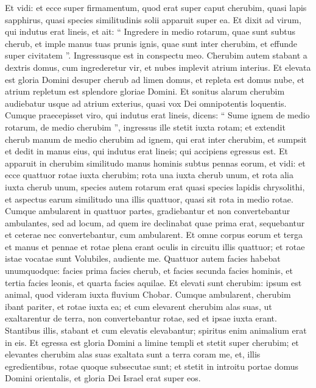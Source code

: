 \begin{biblechapter}
\begin{biblechapter}
\begin{biblechapter}
\begin{biblechapter}
\begin{biblechapter}
\begin{biblechapter}
\begin{biblechapter}
\begin{biblechapter}
\begin{biblechapter}
\begin{biblechapter}
\verse Et vidi: et ecce super firmamentum, quod erat super caput cherubim, quasi lapis sapphirus, quasi species similitudinis solii apparuit super ea. 
 \verse Et dixit ad virum, qui indutus erat lineis, et ait: “ Ingredere in medio rotarum, quae sunt subtus cherub, et imple manus tuas prunis ignis, quae sunt inter cherubim, et effunde super civitatem ”. Ingressusque est in conspectu meo.
 \verse Cherubim autem stabant a dextris domus, cum ingrederetur vir, et nubes implevit atrium interius. 
\verse Et elevata est gloria Domini desuper cherub ad limen domus, et repleta est domus nube, et atrium repletum est splendore gloriae Domini. 
\verse Et sonitus alarum cherubim audiebatur usque ad atrium exterius, quasi vox Dei omnipotentis loquentis.
 \verse Cumque praecepisset viro, qui indutus erat lineis, dicens: “ Sume ignem de medio rotarum, de medio cherubim ”, ingressus ille stetit iuxta rotam; 
\verse et extendit cherub manum de medio cherubim ad ignem, qui erat inter cherubim, et sumpsit et dedit in manus eius, qui indutus erat lineis; qui accipiens egressus est. 
\verse Et apparuit in cherubim similitudo manus hominis subtus pennas eorum, 
 \verse et vidi: et ecce quattuor rotae iuxta cherubim; rota una iuxta cherub unum, et rota alia iuxta cherub unum, species autem rotarum erat quasi species lapidis chrysolithi, 
\verse et aspectus earum similitudo una illis quattuor, quasi sit rota in medio rotae. 
\verse Cumque ambularent in quattuor partes, gradiebantur et non convertebantur ambulantes, sed ad locum, ad quem ire declinabat quae prima erat, sequebantur et ceterae nec convertebantur, cum ambularent. 
\verse Et omne corpus eorum et terga et manus et pennae et rotae plena erant oculis in circuitu illis quattuor; 
\verse et rotae istae vocatae sunt Volubiles, audiente me. 
\verse Quattuor autem facies habebat unumquodque: facies prima facies cherub, et facies secunda facies hominis, et tertia facies leonis, et quarta facies aquilae. 
\verse Et elevati sunt cherubim: ipsum est animal, quod videram iuxta fluvium Chobar. 
\verse Cumque ambularent, cherubim ibant pariter, et rotae iuxta ea; et cum elevarent cherubim alas suas, ut exaltarentur de terra, non convertebantur rotae, sed et ipsae iuxta erant. 
\verse Stantibus illis, stabant et cum elevatis elevabantur; spiritus enim animalium erat in eis.
 \verse Et egressa est gloria Domini a limine templi et stetit super cherubim; 
\verse et elevantes cherubim alas suas exaltata sunt a terra coram me, et, illis egredientibus, rotae quoque subsecutae sunt; et stetit in introitu portae domus Domini orientalis, et gloria Dei Israel erat super eos. 

\end{biblechapter}
\end{biblechapter}
\end{biblechapter}
\end{biblechapter}
\end{biblechapter}
\end{biblechapter}
\end{biblechapter}
\end{biblechapter}
\end{biblechapter}
\end{biblechapter}
